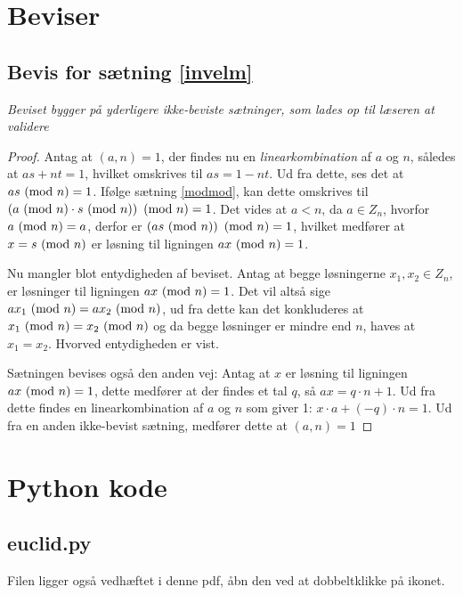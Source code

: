 \section{Beviser} \label{proofs}
\subsection{Bevis for sætning \ref{invelm}}\label{invelemproof}
\textit{Beviset bygger på yderligere ikke-beviste sætninger, som lades op til læseren at validere}
\begin{proof}
    Antag at \((a, n) = 1\), der findes nu en \textit{linearkombination} af \(a\) og \(n\), således at \(a s + n t = 1\),
    hvilket omskrives til \(a s = 1 - n t\).
    Ud fra dette, ses det at \(a s \ (\mathrm{mod}\ n) = 1\).
    Ifølge sætning \ref{modmod}, kan dette omskrives til \(\left(a \ (\mathrm{mod}\ n) \cdot s \ (\mathrm{mod}\ n)\right) \ (\mathrm{mod}\ n) = 1\).
    Det vides at \(a < n\), da \(a \in Z_n\), hvorfor \(a \ (\mathrm{mod}\ n) = a\),
    derfor er \(\left(a s \ (\mathrm{mod}\ n)\right) \ (\mathrm{mod}\ n) = 1\),
    hvilket medfører at \(x = s \ (\mathrm{mod}\ n)\) er løsning til ligningen \(a x \ (\mathrm{mod}\ n) = 1\).
    
    Nu mangler blot entydigheden af beviset.
    Antag at begge løsningerne \(x_1, x_2 \in Z_n\), er løsninger til ligningen \(a x \ (\mathrm{mod}\ n) = 1\).
    Det vil altså sige \(a x_1 \ (\mathrm{mod}\ n) = a x_2 \ (\mathrm{mod}\ n)\),
    ud fra dette kan det konkluderes at \(x_1 \ (\mathrm{mod}\ n) = x_2 \ (\mathrm{mod}\ n)\)
    og da begge løsninger er mindre end \(n\), haves at \(x_1 = x_2\).
    Hvorved entydigheden er vist.

    Sætningen bevises også den anden vej:
    Antag at \(x\) er løsning til ligningen \(a x \ (\mathrm{mod}\ n) = 1\),
    dette medfører at der findes et tal \(q\), så \(a x = q \cdot n + 1\).
    Ud fra dette findes en linearkombination af \(a\) og \(n\) som giver 1:
    \(x \cdot a + (-q) \cdot n = 1\).
    Ud fra en anden ikke-bevist sætning, medfører dette at \((a, n) = 1\)

\end{proof}


\newpage
\section{Python kode}
\subsection{euclid.py}
\label{file:euclid}
Filen ligger også vedhæftet i denne pdf, åbn den ved at dobbeltklikke på ikonet.
\inputminted[python3, linenos, breaklines, frame=lines, fontsize=\footnotesize]{python}{src/euclid.py}


